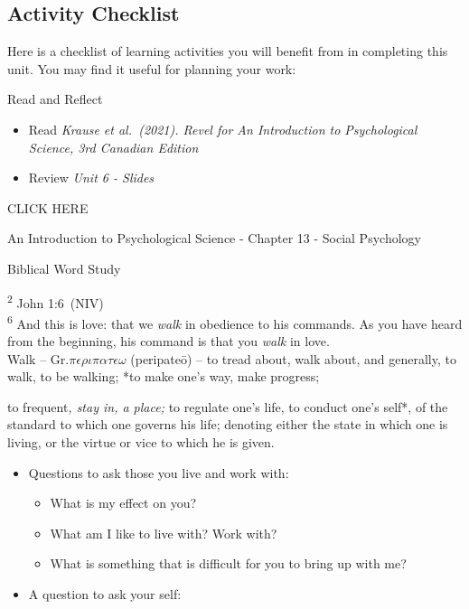 \documentclass[
]{book}
\providecommand{\tightlist}{%
  \setlength{\itemsep}{0pt}\setlength{\parskip}{0pt}}
\begin{document}
\hypertarget{activity-checklist-4}{%
\subsection*{Activity Checklist}\label{activity-checklist-4}}

Here is a checklist of learning activities you will benefit from in completing this unit. You may find it useful for planning your work:

\begin{reflect}
{Read and Reflect}

\begin{itemize}
\item
  Read \emph{Krause et al.~(2021). Revel for An Introduction to Psychological Science, 3rd Canadian Edition}
\item
  Review \emph{Unit 6 - Slides}
\end{itemize}

CLICK HERE

An Introduction to Psychological Science - Chapter 13 - Social Psychology

Biblical Word Study

\textsuperscript{2} John 1:6~(NIV)\\
\textsuperscript{6} And this is love: that we \emph{walk} in obedience to his commands. As you have heard from the beginning, his command is that you \emph{walk} in love.\\
Walk -- Gr.\(\pi\epsilon\rho\iota\pi\alpha\tau\epsilon\omega\) (peripateō) -- to tread about, walk about, and generally, to walk, to be walking; *to make one's way, make progress;

to frequent\emph{, stay in, a place;
}to regulate one's life, to conduct one's self*, of the standard to which one governs his life; denoting either the state in which one is living, or the virtue or vice to which he is given.

\begin{itemize}
\tightlist
\item
  Questions to ask those you live and work with:

  \begin{itemize}
  \tightlist
  \item
    What is my effect on you?
  \item
    What am I like to live with? Work with?
  \item
    What is something that is difficult for you to bring up with me?
  \end{itemize}
\item
  A question to ask your self:


\end{itemize}
\end{reflect}
\end{document}
